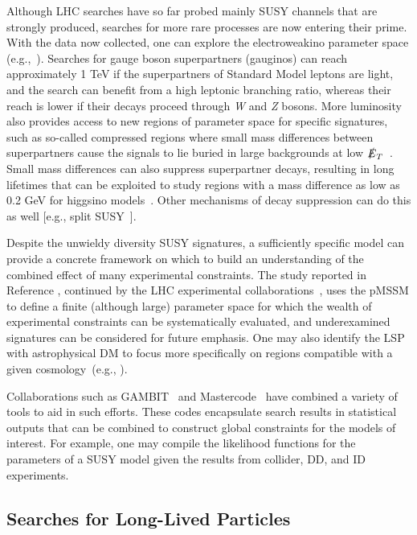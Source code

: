 \documentclass{ar-1col}
\newcommand{\MET}{\ensuremath{\slashed{E}_T}\xspace}
\begin{document}
{Although LHC searches have so far probed mainly  SUSY channels that are strongly produced, searches for more rare processes are now entering their prime. With the data now collected, one can explore the
electroweakino parameter space (e.g.,~). Searches for gauge
boson superpartners (gauginos) can reach approximately 1 TeV if
the superpartners of Standard Model leptons are light, and the search can
benefit from a high leptonic branching ratio, whereas their reach
is lower if their decays proceed through \textit{W} and \textit{Z} bosons. More
luminosity also provides access to new regions of parameter space
for specific signatures, such as so-called compressed regions where small
mass differences between superpartners cause the signals to lie
buried in large backgrounds at low
\MET~\cite{Aaboud:2017leg,Sirunyan:2017zss}. Small mass
differences can also suppress superpartner decays, resulting in
long lifetimes that can be exploited to study regions with a mass
difference as low as 0.2 GeV for higgsino models~\cite{ATL-PHYS-PUB-2017-019}. Other mechanisms of decay
suppression can do this as well [e.g., split
SUSY~\cite{Sirunyan:2018vjp}].

Despite the unwieldy diversity SUSY signatures, a sufficiently
specific model can provide a concrete framework on which to build
an understanding of the combined effect of many experimental
constraints. The study reported in Reference , continued by the LHC
experimental collaborations~\cite{Aad:2015baa, Khachatryan:2016nvf}, uses the
pMSSM to define a finite (although large) parameter space for
which the wealth of experimental constraints can be systematically
evaluated, and underexamined signatures can be considered for future emphasis.
One may also identify the LSP with astrophysical DM
to focus more specifically on regions compatible with a given
cosmology~(e.g., ).

Collaborations such as GAMBIT~\cite{Athron:2017ard} and
Mastercode~\cite{Bagnaschi:2017tru} have combined a variety of
tools to aid in such efforts. These codes encapsulate search
results in statistical outputs that can be combined to construct
global constraints for the models of interest. For example, one
may compile the likelihood functions for the parameters of a SUSY
model given the results from collider, DD, and ID experiments.

\subsection{Searches for Long-Lived Particles}\label{sec:results_LLPSearches}

}
\end{document}

